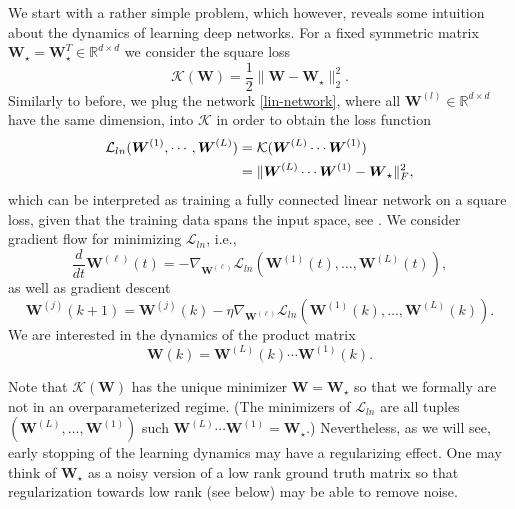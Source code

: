\documentclass{svproc}
\newcommand{\bW}{\boldsymbol{W}}
\newcommand{\0}{\boldsymbol{0}}
\newcommand{\1}{\boldsymbol{1}}
\def\R{\mathbb{R}}
\begin{document}
We start with a rather simple problem, which however, reveals some intuition about the dynamics of learning deep networks. For a fixed symmetric matrix 
$\bW_\star = \bW_\star^T \in \R^{d \times d}$
we consider the square loss
\[
\mathcal{K}(\bW) = \frac{1}{2} \|\bW - \bW_\star\|_2^2. 
\]
Similarly to before, we plug the network \eqref{lin-network}, where all $\bW^{(l)} \in \R^{d \times d}$ have the same dimension, into $\mathcal{K}$ in order to obtain the loss function
\begin{align}\label{eq:matrix_fullrank}
\mathcal{L}_{ln}(\bW^{(1)},\cdots,\bW^{(L)}) &= \mathcal{K}(\bW^{(L)} \cdots \bW^{(1)}) \notag \\
&= 
\|\bW^{(L)}\cdots\bW^{(1)}-\bW_\star\|_F^2,
\end{align}
which can be interpreted as training a fully connected linear network on a square loss, given that the training data spans the input space, see \cite{chou2024gradient}.
We consider gradient flow for minimizing $\mathcal{L}_{ln}$, i.e.,
\begin{equation}\label{grad-flow-E}
\frac{d}{dt} \bW^{(\ell)}(t) = - \nabla_{\bW^{(\ell)}} \mathcal{L}_{ln} (\bW^{(1)}(t),\hdots, \bW^{(L)}(t)),
\end{equation}
as well as gradient descent
\begin{equation}\label{grad-descent-W}
\bW^{(j)}(k+1) = \bW^{(j)} (k) - \eta \nabla_{\bW^{(\ell)}} \mathcal{L}_{ln} (\bW^{(1)}(k),\hdots, \bW^{(L)}(k)).
\end{equation}
We are interested in the dynamics of the product matrix
\begin{equation}\label{prod-matrix-k}
\bW(k) = \bW^{(L)}(k)\cdots\bW^{(1)}(k).
\end{equation}

Note that $\mathcal{K}(\bW)$ has the unique minimizer $\bW = \bW_\star$ so that we formally are not in an overparameterized regime. (The minimizers of $\mathcal{L}_{ln}$ are all tuples $(\bW^{(L)}, \hdots, \bW^{(1)})$ such $\bW^{(L)} \cdots \bW^{(1)} = \bW_\star$.) Nevertheless, as we will see, early stopping of the learning dynamics may have a regularizing effect. One may think of $\bW_\star$ as a noisy version of a low rank ground truth matrix so that regularization towards low rank (see below) may be able to remove noise.
\end{document}
